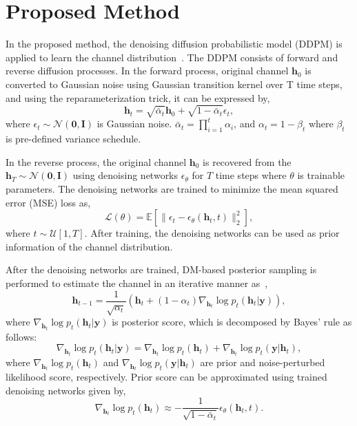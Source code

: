 \documentclass[lettersize,journal]{IEEEtran}
\begin{document}
\section{Proposed Method}

In the proposed method, the denoising diffusion probabilistic model (DDPM) is applied to learn the channel distribution~\cite{hoDenoisingDiffusionProbabilistic2020}. The DDPM consists of forward and reverse diffusion processes. In the forward process, original channel $\mathbf{h}_{0}$ is converted to Gaussian noise using Gaussian transition kernel over T time steps, and using the reparameterization trick, it can be expressed by,
\begin{equation}
\mathbf{h}_{t} = \sqrt{ \bar{\alpha}_{t} }\mathbf{h}_{0} + \sqrt{ 1-\bar{\alpha}_{t} }\epsilon_{t},
\end{equation}
where $\epsilon_{t}\sim\mathcal{N}(\mathbf{0},\mathbf{I})$ is Gaussian noise. $\bar{\alpha}_{t}=\prod_{i=1}^{t}\alpha_{i}$, and $\alpha_{t}=1-\beta_{t}$ where $\beta_{t}$ is pre-defined variance schedule. 

In the reverse process, the original channel $\mathbf{h}_{0}$ is recovered from the $\mathbf{h}_{T}\sim\mathcal{N}(\mathbf{0},\mathbf{I})$ using denoising networks $\epsilon_{\theta}$ for $T$ time steps where $\theta$ is trainable parameters. The denoising networks are trained to minimize the mean squared error (MSE) loss as,
\begin{equation}
\mathcal{L}(\theta) = \mathbb{E}[\|\epsilon_{t} - \epsilon_{\theta}(\mathbf{h}_{t},t)\|_{2}^{2}],
\end{equation}
where $t\sim\mathcal{U}[1,T]$. After training, the denoising networks can be used as prior information of the channel distribution.

After the denoising networks are trained, DM-based posterior sampling is performed to estimate the channel in an iterative manner as~\cite{zhouGenerativeDiffusionModels2025},
\begin{equation}
\mathbf{h}_{t-1} = \frac{1}{\sqrt{ \alpha_{t} }}(\mathbf{h}_{t}+(1-\alpha_{t})\nabla_{\mathbf{h}_{t}}\log p_{t}(\mathbf{h}_{t}|\mathbf{y})),
\end{equation}
where $\nabla_{\mathbf{h}_{t}}\log p_{t}(\mathbf{h}_{t}|\mathbf{y})$ is posterior score, which is decomposed by Bayes' rule as follows:
\begin{equation}
\nabla_{\mathbf{h}_{t}}\log p_{t}(\mathbf{h}_{t}|\mathbf{y}) = \nabla_{\mathbf{h}_{t}}\log p_{t}(\mathbf{h}_{t})+\nabla_{\mathbf{h}_{t}}\log p_{t}(\mathbf{y}|\mathbf{h}_{t}),
\end{equation}
where $\nabla_{\mathbf{h}_{t}}\log p_{t}(\mathbf{h}_{t})$ and $\nabla_{\mathbf{h}_{t}}\log p_{t}(\mathbf{y}|\mathbf{h}_{t})$ are prior and noise-perturbed likelihood score, respectively.
Prior score can be approximated using trained denoising networks given by,
\begin{equation}
\nabla_{\mathbf{h}_{t}}\log p_{t}(\mathbf{h}_{t})\approx -\frac{1}{\sqrt{ 1-\bar{\alpha}_{t} }}\epsilon_{\theta}(\mathbf{h}_{t},t).
\end{equation}
\end{document}
